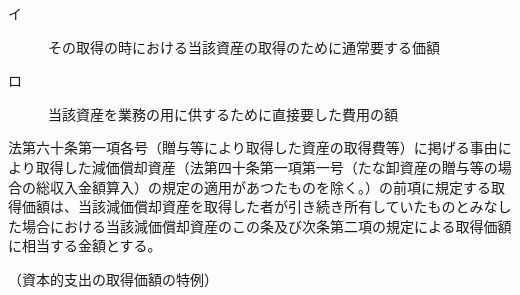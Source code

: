 \documentclass[twocolumn,a4j,10pt]{ltjtarticle}
\begin{document}
\begin{description}
\begin{description}
\begin{description}
\item[イ]その取得の時における当該資産の取得のために通常要する価額
\item[ロ]当該資産を業務の用に供するために直接要した費用の額
\end{description}
\end{description}
\item[\rensuji{2}]法第六十条第一項各号（贈与等により取得した資産の取得費等）に掲げる事由により取得した減価償却資産（法第四十条第一項第一号（たな卸資産の贈与等の場合の総収入金額算入）の規定の適用があつたものを除く。）の前項に規定する取得価額は、当該減価償却資産を取得した者が引き続き所有していたものとみなした場合における当該減価償却資産のこの条及び次条第二項の規定による取得価額に相当する金額とする。
\end{description}
\noindent\hspace{10pt}（資本的支出の取得価額の特例）
\end{document}

